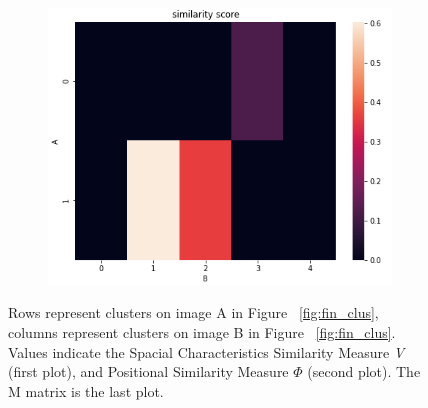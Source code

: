 \begin{figure}[H]
\begin{subfigure}[H]{0.51\textwidth}
    \centering
\includegraphics[width=\linewidth]{figures/chapter4/velopix_clusters/similarity.png}
\end{subfigure}
\caption{Rows represent clusters on image A in Figure ~\ref{fig:fin_clus}, columns represent clusters on image B in Figure ~\ref{fig:fin_clus}. Values indicate the Spacial Characteristics Similarity Measure \textit{V} (first plot), and Positional Similarity Measure \textit{$\Phi$} (second plot). The M matrix is the last plot.
}
\label{fig:sims}
\end{figure}

